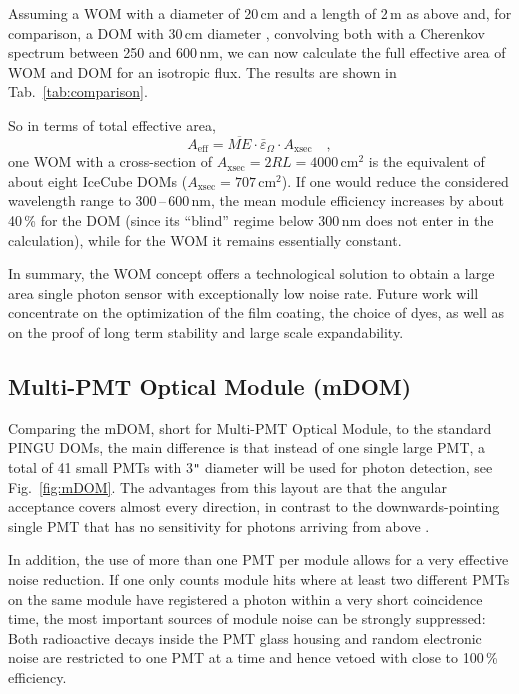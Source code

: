 Assuming a WOM with a diameter of 20\,cm and a length of 2\,m as above and, for 
comparison, a DOM with 30\,cm diameter \cite{ICdom}, convolving both with a 
Cherenkov spectrum between 250 and 600\,nm, we can now calculate the full 
effective area of WOM and DOM for an isotropic flux. The results are shown in 
Tab.~\ref{tab:comparison}.

So in terms of total effective area, 
\begin{equation}
 A_\mathrm{eff} = \overline{ME}\cdot \bar\varepsilon_\Omega\cdot 
A_\mathrm{xsec}\quad,
\end{equation}
one WOM with a cross-section of $A_\mathrm{xsec} = 2 R L = 4000$\,cm$^2$ is the 
equivalent of about eight IceCube DOMs ($A_\mathrm{xsec} = 707$\,cm$^2$). If one 
would reduce the considered wavelength range to 300\,--\,600\,nm, the mean
module efficiency increases by about 40\,\% for the DOM (since its ``blind'' 
regime below 300\,nm does not enter in the calculation), while for the WOM it 
remains essentially constant.

In summary, the WOM concept offers a technological solution to obtain a 
large area single photon sensor with exceptionally low noise rate. Future work 
will concentrate on the optimization of the film coating, the choice of dyes,
as well as on the proof of long term stability and large scale expandability.




\subsection{Multi-PMT Optical Module (mDOM)}
\label{sec:mDOM}

Comparing the mDOM, short for Multi-PMT Optical Module, to the standard PINGU
DOMs, the main difference is that instead of one single large PMT, a total of
41 small PMTs with 3\verb+"+ diameter will be used for photon detection, see
Fig.~\ref{fig:mDOM}. The advantages from this layout are that the angular
acceptance covers almost every direction, in contrast to the downwards-pointing
single PMT that has no sensitivity for photons arriving from above
\cite{mDOM_Geneva}.

In addition, the use of more than one PMT per module allows for a very
effective noise reduction. If one only counts module hits where at least two
different PMTs on the same module have registered a photon within a very short
coincidence time, the most important sources of module noise can be strongly
suppressed: Both radioactive decays inside the PMT glass housing and random
electronic noise are restricted to one PMT at a time and hence vetoed with
close to 100\,\% efficiency.
